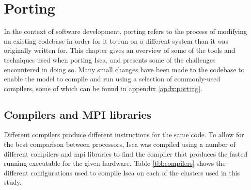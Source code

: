 \documentclass[a4paper,11pt]{report}
\begin{document}
\let\textcircled=\pgftextcircled
\chapter{Porting}
\label{chap:baselineexp}
In the context of software development, porting refers to the process of modifying an existing codebase in order for it to run on a different system than it was originally written for. This chapter gives an overview of some of the tools and techniques used when porting Isca, and presents some of the challenges encountered in doing so. Many small changes have been made to the codebase to enable the model to compile and run using a selection of commonly-used compilers, some of which can be found in appendix \ref{apdx:porting}. 

\section{Compilers and MPI libraries}
Different compilers produce different instructions for the same code. To allow for the best comparison between processors, Isca was compiled using a number of different compilers and \gls{mpi} libraries to find the compiler that produces the fasted running executable for the given hardware. Table \ref{tbl:compilers} shows the different configurations used to compile Isca on each of the clusters used in this study. 
\end{document}
